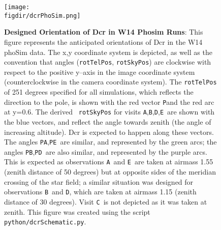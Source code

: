 \documentclass[prd, nofootinbib, floatfix, 11pt, tightenlines, times]{article}
\def\figdir{../figures}
\def\A{{\tt A}}
\def\B{{\tt B}}
\def\C{{\tt C}}
\def\D{{\tt D}}
\def\E{{\tt E}}
\def\P{{\tt P}}
\begin{document}
\begin{figure}[h!]
  \centering
  \texttt{[image: \\figdir/dcrPhoSim.png]}
  \caption{{\bf Designed Orientation of Dcr in W14 Phosim Runs}: This
    figure represents the anticipated orientations of Dcr in the W14
    phoSim data.  The x,y coordinate system is depicted, as well as
    the convention that angles ({\tt rotTelPos}, {\tt rotSkyPos}) are
    clockwise with respect to the positive y--axis in the image
    coordinate system (counterclockwise in the camera coordinate
    system).  The {\tt rotTelPos} of 251 degrees specified for all
    simulations, which reflects the direction to the pole, is shown
    with the red vector \P and the red arc at y=0.6.  The derived {\tt
      rotSkyPos} for visits \A,\B,\D,\E\ are shown with the blue
    vectors, and reflect the angle towards zenith (the angle of
    increasing altitude).  Dcr is expected to happen along these
    vectors.  The angles \P\A,\P\E\ are similar, and represented by
    the green arcs; the angles \P\B,\P\D\ are also similar, and
    represented by the purple arcs.  This is expected as observations
    \A\ and \E\ are taken at airmass 1.55 (zenith distance of 50
    degrees) but at opposite sides of the meridian crossing of the
    star field; a similar situation was designed for observations
    \B\ and \D, which are taken at airmass 1.15 (zenith distance of 30
    degrees).  Visit \C\ is not depicted as it was taken at zenith.
    This figure was created using the script {\tt
      python/dcrSchematic.py}.}
  \label{fig:phosimdcr}
\end{figure}
\end{document}
